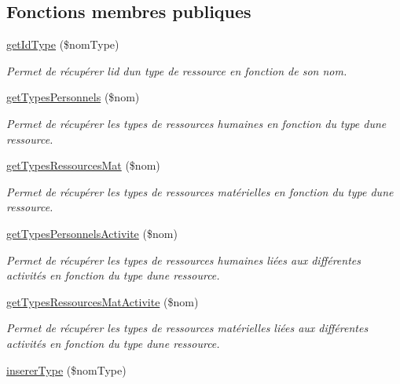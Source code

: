 \subsection*{Fonctions membres publiques}
\begin{DoxyCompactItemize}
\item 
\hyperlink{class_m___type_ressource_a2b7dcf76241f926cc5f2d91bc4f4e6a1}{get\+Id\+Type} (\$nom\+Type)
\begin{DoxyCompactList}\small\item\em Permet de récupérer l\textquotesingle{}id d\textquotesingle{}un type de ressource en fonction de son nom. \end{DoxyCompactList}\item 
\hyperlink{class_m___type_ressource_a3c28369308cbb0f32f3b6c1496710a66}{get\+Types\+Personnels} (\$nom)
\begin{DoxyCompactList}\small\item\em Permet de récupérer les types de ressources humaines en fonction du type d\textquotesingle{}une ressource. \end{DoxyCompactList}\item 
\hyperlink{class_m___type_ressource_a2a68850fe5a03eee6cca5db64afd8da1}{get\+Types\+Ressources\+Mat} (\$nom)
\begin{DoxyCompactList}\small\item\em Permet de récupérer les types de ressources matérielles en fonction du type d\textquotesingle{}une ressource. \end{DoxyCompactList}\item 
\hyperlink{class_m___type_ressource_a6ce2e48c018e8d6113171e0f963c4a0a}{get\+Types\+Personnels\+Activite} (\$nom)
\begin{DoxyCompactList}\small\item\em Permet de récupérer les types de ressources humaines liées aux différentes activités en fonction du type d\textquotesingle{}une ressource. \end{DoxyCompactList}\item 
\hyperlink{class_m___type_ressource_a39c1caa106754ac333387c7748bf5dc8}{get\+Types\+Ressources\+Mat\+Activite} (\$nom)
\begin{DoxyCompactList}\small\item\em Permet de récupérer les types de ressources matérielles liées aux différentes activités en fonction du type d\textquotesingle{}une ressource. \end{DoxyCompactList}\item 
\hyperlink{class_m___type_ressource_ac4e32311ae87ecbde6e25e54479525aa}{inserer\+Type} (\$nom\+Type)

\end{DoxyCompactItemize}
